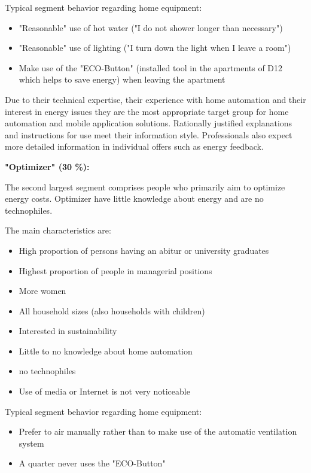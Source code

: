 Typical segment behavior regarding home equipment:
 \begin{itemize}
 	\item "Reasonable" use of hot water ("I do not shower longer than necessary")
 	\item "Reasonable" use of lighting ("I turn down the light when I leave a room")
 	\item Make use of the "ECO-Button" (installed tool in the apartments of D12 which helps to save energy) when leaving the apartment
 \end{itemize}

Due to their technical expertise, their experience with home automation and their interest in energy issues they are the most appropriate target group for home automation and mobile application solutions. Rationally justified explanations and instructions for use meet their information style. Professionals also expect more detailed information in individual offers such as energy feedback.

\textbf{"Optimizer" (30 \%):}

The second largest segment comprises people who primarily aim to optimize energy costs. Optimizer have little knowledge about energy and are no technophiles.

The main characteristics are:
\begin{itemize}
	\item High proportion of persons having an abitur or university graduates
	\item Highest proportion of people in managerial positions
	\item More women
	\item All household sizes (also households with children)
	\item Interested in sustainability	
	\item Little to no knowledge about home automation
	\item no technophiles
	\item Use of media or Internet is not very noticeable
\end{itemize}

Typical segment behavior regarding home equipment:
\begin{itemize}
	\item Prefer to air manually rather than to make use of the automatic ventilation system
	\item A quarter never uses the "ECO-Button"
\end{itemize}

